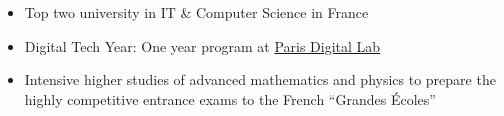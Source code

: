 \begin{itemize}
	\item Top two university in IT \& Computer Science in France
  \item Digital Tech Year: One year program at \href{https://paris-digital-lab.com/}{Paris Digital Lab}
\end{itemize}
\divider
{}
\begin{itemize}
	\item Intensive higher studies of advanced mathematics and physics to prepare the highly competitive entrance exams to the French ``Grandes Écoles''
\end{itemize}
